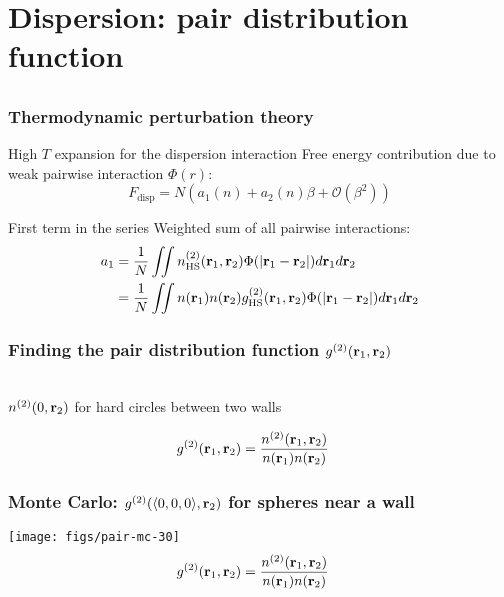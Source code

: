
\section{Dispersion: pair distribution function}

\subsection{}

\begin{frame}
  \frametitle{Thermodynamic perturbation theory}
  \begin{block}{High $T$ expansion for the dispersion interaction}
    Free energy contribution due to weak pairwise interaction $\Phi(r)$:
    \[
    F_\text{disp} = N\left(a_1(n) + a_2(n)\beta + \mathcal{O}(\beta^2)\right)
    \]
  \end{block}
  \begin{block}{First term in the series}
    Weighted sum of all pairwise interactions:
    \begin{align*}
      a_1 &= \frac1{N}\iint n^{(2)}_{\text{HS}}(\mathbf{r}_1,\mathbf{r}_2)\Phi(|\mathbf{r}_1-\mathbf{r}_2|)d\mathbf{r}_1d\mathbf{r}_2
      \\
      &= \frac1{N}\iint n(\mathbf{r}_1)n(\mathbf{r}_2)g^{(2)}_{\text{HS}}(\mathbf{r}_1,\mathbf{r}_2)\Phi(|\mathbf{r}_1-\mathbf{r}_2|)d\mathbf{r}_1d\mathbf{r}_2
    \end{align*}
  \end{block}
\end{frame}

\begin{frame}
  \frametitle{Finding the pair distribution function $g^{(2)}(\mathbf{r}_1,\mathbf{r}_2)$}
  \vspace{-0.8em}
  \begin{center}
    \\
    \vspace{-4.0em}
    $n^{(2)}(0,\mathbf{r}_2)$ for hard circles between two walls
  \end{center}
  \begin{align*}
    g^{(2)}(\mathbf{r}_1,\mathbf{r}_2) &= \frac{n^{(2)}(\mathbf{r}_1,\mathbf{r}_2)}{n(\mathbf{r}_1)n(\mathbf{r}_2)}
  \end{align*}
\end{frame}

\begin{frame}
  \frametitle{Monte Carlo: $g^{(2)}(\langle 0,0,0\rangle,\mathbf{r}_2)$ for spheres near a wall}
  \texttt{[image: figs/pair-mc-30]}
  \begin{align*}
    g^{(2)}(\mathbf{r}_1,\mathbf{r}_2) &= \frac{n^{(2)}(\mathbf{r}_1,\mathbf{r}_2)}{n(\mathbf{r}_1)n(\mathbf{r}_2)}
  \end{align*}
\end{frame}

